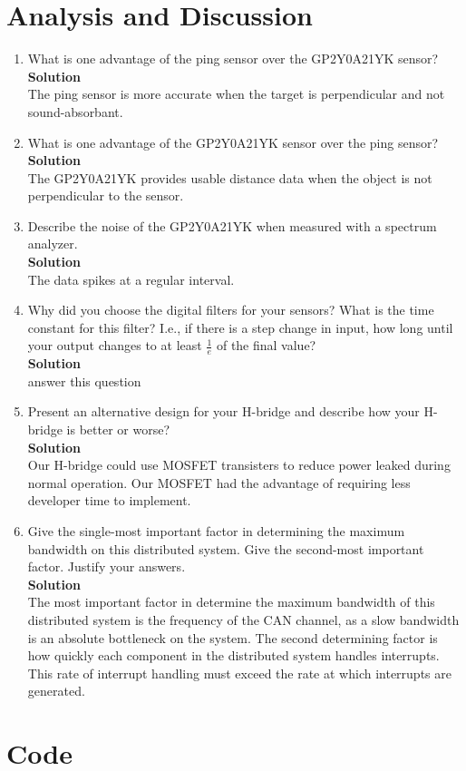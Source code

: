 \documentclass[12pt]{article}
\renewcommand{\Solnlabel}[1]{\textbf{Solution}\quad}
\newcommand{\todo}[1]{{\color{red}{\LARGE TODO} #1}}
\begin{document}
\section{Analysis and Discussion}

\begin{enumerate}[1)]
\item What is one advantage of the ping sensor over the GP2Y0A21YK
  sensor? \\ \Solnlabel \newline \\
  The ping sensor is more accurate when the target is perpendicular
  and not sound-absorbant.
\item What is one advantage of the GP2Y0A21YK sensor over the ping
  sensor? \\ \Solnlabel \newline \\
  The GP2Y0A21YK provides usable distance data when the object is not
  perpendicular to the sensor.
\item Describe the noise of the GP2Y0A21YK when measured with a
  spectrum analyzer. \\ \Solnlabel \newline \\
  The data spikes at a regular interval.
\item Why did you choose the digital filters for your sensors? What is
  the time constant for this filter? I.e., if there is a step change
  in input, how long until your output changes to at least $\frac{1}{e}$ of the
  final value? \\ \Solnlabel \newline \\
  \todo{answer this question}
\item Present an alternative design for your H-bridge and describe how
  your H-bridge is better or worse? \\ \Solnlabel \newline \\
  Our H-bridge could use MOSFET transisters to reduce power leaked
  during normal operation. Our MOSFET had the advantage of requiring
  less developer time to implement.
\item Give the single-most important factor in determining the maximum
  bandwidth on this distributed system.  Give the second-most
  important factor. Justify your answers. \\ \Solnlabel \newline \\
  The most important factor in determine the maximum bandwidth of this
  distributed system is the frequency of the CAN channel, as a slow
  bandwidth is an absolute bottleneck on the system. The second
  determining factor is how quickly each component in the distributed
  system handles interrupts. This rate of interrupt handling must
  exceed the rate at which interrupts are generated.
\end{enumerate}

\newpage
\section{Code}

\end{document}
